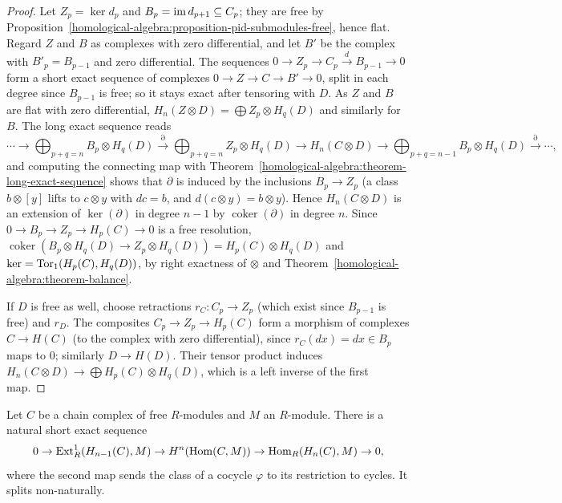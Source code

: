 \begin{proof}
Let $Z_p = \ker d_p$ and $B_p = \operatorname{im} d_{p+1} \subseteq C_p$; they are free by
Proposition~\ref{homological-algebra:proposition-pid-submodules-free}, hence flat. Regard $Z$ and $B$ as complexes with zero
differential, and let $B'$ be the complex with $B'_p = B_{p-1}$ and zero differential. The sequences
$0 \to Z_p \to C_p \xrightarrow{d} B_{p-1} \to 0$ form a short exact sequence of complexes $0 \to Z \to C \to B' \to 0$, split in each degree
since $B_{p-1}$ is free; so it stays exact after tensoring with $D$. As $Z$ and $B$ are
flat with zero differential, $H_n(Z \otimes D) = \bigoplus Z_p \otimes H_q(D)$ and similarly for $B$. The long exact sequence reads
\[
\cdots \to \bigoplus_{p+q=n}B_p \otimes H_q(D) \xrightarrow{\partial} \bigoplus_{p+q=n}Z_p \otimes H_q(D) \to H_n(C \otimes D) \to
\bigoplus_{p+q=n-1}B_p \otimes H_q(D) \xrightarrow{\partial} \cdots,
\]
and computing the connecting map with Theorem~\ref{homological-algebra:theorem-long-exact-sequence} shows that $\partial$ is induced by
the inclusions $B_p \to Z_p$ (a class $b \otimes [y]$ lifts to $c \otimes y$ with $dc = b$, and $d(c \otimes y) = b \otimes y$). Hence
$H_n(C \otimes D)$ is an extension of $\ker(\partial)$ in degree $n - 1$ by $\operatorname{coker}(\partial)$ in degree $n$. Since
$0 \to B_p \to Z_p \to H_p(C) \to 0$ is a free resolution, $\operatorname{coker}(B_p \otimes H_q(D) \to Z_p \otimes H_q(D)) = H_p(C) \otimes H_q(D)$ and
$\ker = \operatorname{Tor}_1(H_p(C), H_q(D))$, by right exactness of $\otimes$ and Theorem~\ref{homological-algebra:theorem-balance}.

If $D$ is free as well, choose retractions $r_C \colon C_p \to Z_p$ (which exist since $B_{p-1}$ is free) and $r_D$. The composites
$C_p \to Z_p \to H_p(C)$ form a morphism of complexes $C \to H(C)$ (to the complex with zero differential), since $r_C(dx) = dx \in B_p$
maps to $0$; similarly $D \to H(D)$. Their tensor product induces $H_n(C \otimes D) \to \bigoplus H_p(C) \otimes H_q(D)$, which is a left
inverse of the first map.
\end{proof}

\begin{theorem}\label{homological-algebra:theorem-universal-coefficients}
Let $C$ be a chain complex of free $R$-modules and $M$ an $R$-module. There is a natural short exact sequence
\[
0 \to \operatorname{Ext}^1_R(H_{n-1}(C), M) \to H^n(\operatorname{Hom}(C, M)) \to \operatorname{Hom}_R(H_n(C), M) \to 0,
\]
where the second map sends the class of a cocycle $\varphi$ to its restriction to cycles. It splits non-naturally.
\end{theorem}

